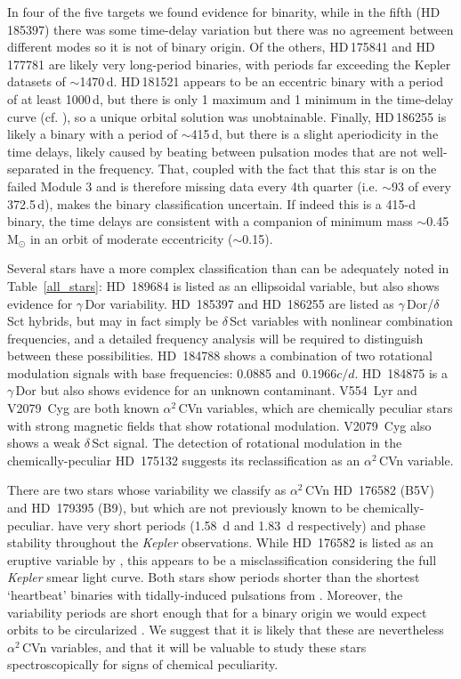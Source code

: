 \documentclass[a4paper,fleqn,usenatbib]{mnras}
\newcommand{\kepler}{\emph{Kepler}\xspace}
\begin{document}
In four of the five targets we found evidence for binarity, while in the fifth (HD\,185397) there was some time-delay variation but there was no agreement between different modes so it is not of binary origin. Of the others, HD\,175841 and HD\,177781 are likely very long-period binaries, with periods far exceeding the Kepler datasets of $\sim$1470\,d. HD\,181521 appears to be an eccentric binary with a period of at least 1000\,d, but there is only 1 maximum and 1 minimum in the time-delay curve (cf. \citep{murphy&shibahashi2015}), so a unique orbital solution was unobtainable. Finally, HD\,186255 is likely a binary with a period of $\sim$415\,d, but there is a slight aperiodicity in the time delays, likely caused by beating between pulsation modes that are not well-separated in the frequency. That, coupled with the fact that this star is on the failed Module 3 and is therefore missing data every 4th quarter (i.e. $\sim$93 of every 372.5\,d), makes the binary classification uncertain. If indeed this is a 415-d binary, the time delays are consistent with a companion of minimum mass $\sim$0.45\,M$_{\odot}$ in an orbit of moderate eccentricity ($\sim$0.15).

Several stars have a more complex classification than can be adequately noted in Table~\ref{all_stars}: HD~189684 is listed as an ellipsoidal variable, but also shows evidence for $\gamma$\,Dor variability. HD~185397 and HD~186255 are listed as $\gamma$\,Dor/$\delta$\,Sct hybrids, but may in fact simply be $\delta$\,Sct variables with nonlinear combination frequencies, and a detailed frequency analysis will be required to distinguish between these possibilities. HD~184788 shows a combination of two rotational modulation signals with base frequencies: 0.0885 and~$0.1966 c/d$. HD~184875 is a $\gamma$\,Dor but also shows evidence for an unknown contaminant. V554~Lyr and V2079~Cyg are both known $\alpha^2$\,CVn variables, which are chemically peculiar stars with strong magnetic fields that show rotational modulation. V2079~Cyg also shows a weak $\delta$\,Sct signal. The detection of rotational modulation in the chemically-peculiar HD~175132 suggests its reclassification as an $\alpha^2$\,CVn variable. 

There are two stars whose variability we classify as $\alpha^2$\,CVn  HD~176582 (B5V) and HD~179395 (B9), but which are not previously known to be chemically-peculiar. have very short periods (1.58~d and 1.83~d respectively) and phase stability throughout the \kepler observations. While HD~176582 is listed as an eruptive variable by \citet{2016ApJ...829...23D}, this appears to be a misclassification considering the full \kepler smear light curve. Both stars show periods shorter than the shortest `heartbeat' binaries with tidally-induced pulsations from \citet{2012ApJ...753...86T}. Moreover, the variability periods are short enough that for a binary origin we would expect orbits to be circularized \citep{2000A&A...354..881D}. We suggest that it is likely that these are nevertheless $\alpha^2$\,CVn variables, and that it will be valuable to study these stars spectroscopically for signs of chemical peculiarity.
\end{document}
